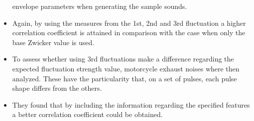 \begin{itemize}
        envelope parameters when generating the sample sounds.
    \item Again, by using the measures from the 1st, 2nd and 3rd fluctuation a
        higher correlation coefficient is attained in comparison with the case
        when only the base Zwicker value is used.
    \item To assess whether using 3rd fluctuations make a difference regarding
        the expected fluctuation strength value, motorcycle exhaust noises where
        then analyzed. These have the particularity that, on a set of pulses,
        each pulse shape differs from the others. 
    \item They found that by including the information regarding the specified
        features a better correlation coefficient could be obtained.
\end{itemize}

